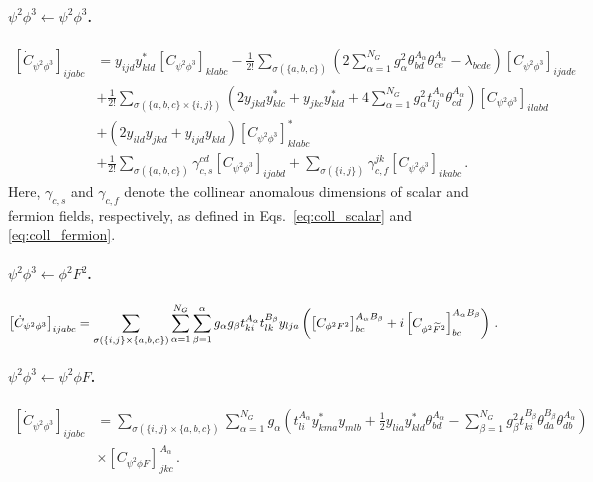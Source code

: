 \paragraph{\texorpdfstring{$\psi^2 \phi^3 \leftarrow \psi^2 \phi^3$}{psi2phi3frompsi2phi3}.}

\begin{align}
    \left[\dot C_{\psi^2\phi^3}\right]_{ijabc} &= 
     y_{ijd}y_{kld}^* \left[ C_{\psi^2\phi^3}\right]_{klabc}
    - \frac{1}{2!}\sum_{\sigma(\{a,b,c\})} \left(2\sum_{\alpha=1}^{N_G} g_\alpha^2 \theta^{A_\alpha}_{bd}\theta^{A_\alpha}_{ce}-\lambda_{bcde}\right)\left[ C_{\psi^2\phi^3}\right]_{ijade} \nonumber 
\\
    & + \frac{1}{2!}\sum_{\sigma(\{a,b,c\}\times \{i,j\})}\left(2 y_{jkd}y^*_{klc}+y_{jkc}y^*_{kld}+ 4 \sum_{\alpha=1}^{N_G} g_\alpha^2 t^{A_\alpha}_{lj} \theta^{A_\alpha}_{cd}\right)\left[ C_{\psi^2\phi^3}\right]_{ilabd} \nonumber \\
    &+(2y_{ild}y_{jkd}+y_{ijd}y_{kld})\left[C_{\psi^2\phi^3}\right]_{klabc}^* \nonumber
\\
    & + \frac{1}{2!}\sum_{\sigma(\{a,b,c\})} \gamma_{c,s}^{cd} \left[ C_{\psi^2\phi^3}\right]_{ijabd} + \sum_{\sigma(\{i,j\})}\gamma_{c,f}^{jk} \left[ C_{\psi^2\phi^3}\right]_{ikabc} \,.\label{psi2phi3_psi2phi3}
\end{align}
Here, $\gamma_{c,s}$ and $\gamma_{c,f}$ denote the collinear anomalous dimensions of scalar and fermion fields, respectively, as defined in Eqs.~\eqref{eq:coll_scalar} and \eqref{eq:coll_fermion}.

\paragraph{\texorpdfstring{$\psi^2 \phi^3 \leftarrow \phi^2 F^2$.}{psi2phi3fromphi2F2}}

\begin{align}
    \left[\dot C_{\psi^2\phi^3}\right]_{ijabc} &= \sum_{\sigma(\{i,j\}\times\{a,b,c\})} \sum_{\alpha=1}^{N_G}\sum_{\beta=1}^{\alpha} g_\alpha g_\beta t^{A_\alpha}_{ki} t^{B_\beta}_{lk} y_{lja} \left(\left[C_{\phi^2 F^2}\right]_{bc}^{A_\alpha B_\beta}+i\left[C_{\phi^2 \widetilde{F}^2}\right]_{bc}^{A_\alpha B_\beta} \right) \,.
    \label{psi2phi3_phi2F2}
\end{align}

\paragraph{\texorpdfstring{$\psi^2 \phi^3 \leftarrow \psi^2 \phi F$.}{psi2phi3fromphi2phiF}}
\begin{align}
    \left[\dot C_{\psi^2\phi^3}\right]_{ijabc} &= \sum_{\sigma(\{i,j\}\times\{a,b,c\})} \sum_{\alpha=1}^{N_G} g_\alpha \left(t^{A_\alpha}_{li}y_{kma}^{*} y_{mlb} 
    + \frac{1}{2}y_{lia}^{\phantom *} y_{kld}^* \theta^{A_\alpha}_{bd} 
    - \sum_{\beta=1}^{N_G} g_\beta^2 t^{B_\beta}_{ki} \theta^{B_\beta}_{da} \theta^{A_\alpha}_{db} \right)
    \nonumber \\&\times \left[C_{\psi^2\phi F}\right]_{jkc}^{A_\alpha}\,.\label{psi2phi3_psi2phiF}
\end{align}

